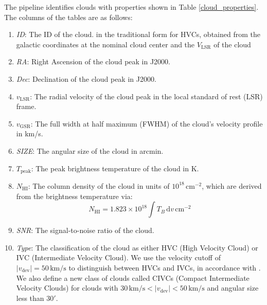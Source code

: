 \documentclass[twocolumn,trackchanges]{aastex701}
\begin{document}
The pipeline identifies clouds with properties shown in Table \ref{cloud_properties}. The columns of the tables are as follows:
\begin{enumerate}
    \item \textit{ID}: The ID of the cloud. in the traditional form for HVCs, obtained from the galactic coordinates at the nominal cloud center and the $V_\mathrm{LSR}$ of the cloud
    \item \textit{RA}: Right Ascension of the cloud peak in J2000.
    \item \textit{Dec}: Declination of the cloud peak in J2000.
    \item $v_\mathrm{LSR}$: The radial velocity of the cloud peak in the local standard of rest (LSR) frame.
    \item $v_\mathrm{GSR}$: The full width at half maximum (FWHM) of the cloud's velocity profile in km/s.
    \item \textit{SIZE}: The angular size of the cloud in arcmin.
    \item $T_\mathrm{peak}$: The peak brightness temperature of the cloud in K.
    \item $N_\mathrm{HI}$: The column density of the cloud in units of $10^{18}\,\mathrm{cm^{-2}}$, which are derived from the brightness temperature via:
    \[
        N_\mathrm{HI} = 1.823 \times 10^{18} \int T_B\,\mathrm{d}v \,\mathrm{cm^{-2}}
    \]
    \item \textit{SNR}: The signal-to-noise ratio of the cloud.
    \item \textit{Type}: The classification of the cloud as either HVC (High Velocity Cloud) or IVC (Intermediate Velocity Cloud). We use the velocity cutoff of $|v_\mathrm{dev}| = 50\,\mathrm{km/s}$ to distinguish between HVCs and IVCs, in accordance with \citet{1991A&A...250..509W}. We also define a new class of clouds called CIVCs (Compact Intermediate Velocity Clouds) for clouds with $30\,\mathrm{km/s} < |v_\mathrm{dev}| < 50\,\mathrm{km/s}$ and angular size less than $30'$.
\end{enumerate}

\clearpage
\end{document}
